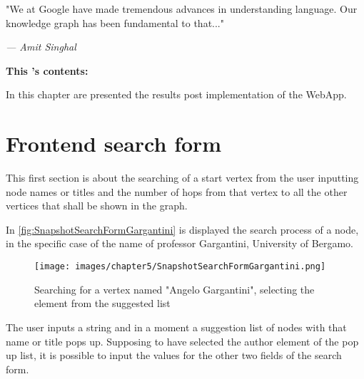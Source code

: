 \begin{figure}[H]%
	\label{fig:\chaptername\thechapter}%
\end{figure}

\vspace*{-4.3cm}
\epigraph{"We at Google have made tremendous advances in understanding language. Our knowledge graph has been fundamental to that..."}{\textit{--- Amit Singhal}}

\noindent \large{\textbf{This {\MakeLowercase{\chaptername}}'s contents:}}
\vspace*{-1.0cm}
\minitoc \mtcskip \minilof
\vspace*{-0.5cm}

In this chapter are presented the results post implementation of the WebApp.
\vspace*{-0.25cm}

\section{Frontend search form} \label{section:Displayoftheresults/Frontendsearchform}
This first section is about the searching of a start vertex from the user inputting node names or titles and the number of hops from that vertex to all the other vertices that shall be shown in the graph.

In \hyperref[fig:SnapshotSearchFormGargantini]{\autoref{fig:SnapshotSearchFormGargantini}} is displayed the search process of a node, in the specific case of the name of professor Gargantini, University of Bergamo.

\begin{figure}[H]%
	\centering%
	\texttt{[image: images/chapter5/SnapshotSearchFormGargantini.png]}%
	\caption[Searching for a vertex named "Angelo Gargantini", selecting the element from the suggested list]{Searching for a vertex named "Angelo Gargantini", selecting the element from the suggested list}%
	\label{fig:SnapshotSearchFormGargantini}%
\end{figure}%

The user inputs a string and in a moment a suggestion list of nodes with that name or title pops up.
Supposing to have selected the author element of the pop up list, it is possible to input the values for the other two fields of the search form.

